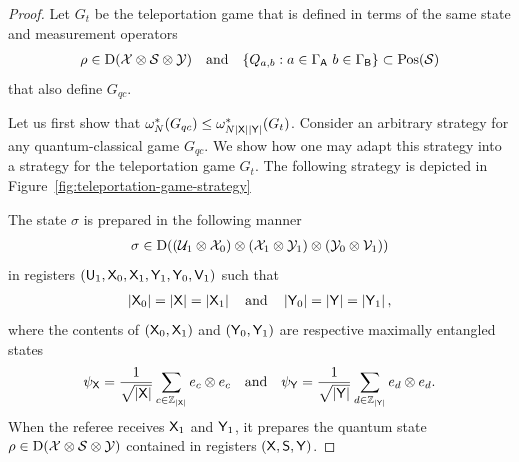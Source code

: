 \begin{proof}
	Let $G_t$ be the teleportation game that is defined in terms of the same state and measurement operators
	\begin{align}
		\rho \in \mathrm{D}(\mathcal{X} \otimes \mathcal{S} \otimes \mathcal{Y}) \quad \textnormal{and} \quad \{ Q_{a,b} : a \in \Gamma_{\mathsf{A}} \ b \in \Gamma_{\mathsf{B}} \} \subset \mathrm{Pos}(\mathcal{S})
	\end{align}	
that also define $G_{qc}$.  

	Let us first show that $\omega_N^*(G_{qc}) \leq \omega_{N\left\lvert \mathsf{X} \right\rvert\left\lvert \mathsf{Y} \right\rvert}^*(G_t)$. Consider an arbitrary strategy for any quantum-classical game $G_{qc}$. We show how one may adapt this strategy into a strategy for the teleportation game $G_t$. The following strategy is depicted in Figure~\ref{fig:teleportation-game-strategy}
	
	The state $\sigma$ is prepared in the following manner 
	\begin{align}
		\sigma \in \mathrm{D}( (\mathcal{U}_1 \otimes \mathcal{X}_0) \otimes (\mathcal{X}_1 \otimes \mathcal{Y}_1) \otimes (\mathcal{Y}_0 \otimes \mathcal{V}_1))
	\end{align}		
in registers $(\mathsf{U}_1, \mathsf{X}_0, \mathsf{X}_1,\mathsf{Y}_1, \mathsf{Y}_0, \mathsf{V}_1)$ such that
	\begin{align}
		 \left\lvert \mathsf{X}_0 \right\rvert = \left\lvert \mathsf{X} \right\rvert = \left\lvert \mathsf{X}_1 \right\rvert \quad \textnormal{and} \quad  \left\lvert \mathsf{Y}_0 \right\rvert = \left\lvert \mathsf{Y} \right\rvert = \left\lvert \mathsf{Y}_1 \right\rvert,	
	\end{align}		
where the contents of $(\mathsf{X}_0,\mathsf{X}_1)$ and $(\mathsf{Y}_0,\mathsf{Y}_1)$ are respective maximally entangled states 
\begin{align}
	\psi_{\mathsf{X}} = \frac{1}{\sqrt{\left\lvert \mathsf{X} \right\rvert}} \sum_{c \in \mathbb{Z}_{\left\lvert \mathsf{X} \right\rvert}} e_c \otimes e_c \quad \textnormal{and} \quad \psi_{\mathsf{Y}} = \frac{1}{\sqrt{\left\lvert \mathsf{Y} \right\rvert}} \sum_{d \in \mathbb{Z}_{\left\lvert \mathsf{Y} \right\rvert}} e_d \otimes e_d.
\end{align}
When the referee receives $\mathsf{X}_1$ and $\mathsf{Y}_1$, it prepares the quantum state $\rho \in \mathrm{D}(\mathcal{X} \otimes \mathcal{S} \otimes \mathcal{Y})$ contained in registers $(\mathsf{X},\mathsf{S},\mathsf{Y})$.


\end{proof}
